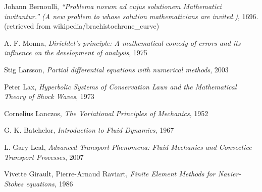 \documentclass[11pt,a4paper]{memoir}
\begin{document}
\begin{thebibliography}{9}
Johann Bernoulli, \textit{``Problema novum ad cujus solutionem Mathematici invitantur.'' (A new problem to whose solution mathematicians are invited.)}, 1696.
(retrieved from wikipedia/brachistochrone\_curve)

A. F. Monna, \textit{Dirichlet's principle: A mathematical comedy of errors and its influence on the development of analysis}, 1975

Stig Larsson, \textit{Partial differential equations with numerical methods}, 2003

Peter Lax, \textit{Hyperbolic Systems of Conservation Laws and the Mathematical Theory of Shock Waves}, 1973

Cornelius Lanczos, \textit{The Variational Principles of Mechanics}, 1952

G. K. Batchelor, \textit{Introduction to Fluid Dynamics}, 1967

L. Gary Leal, \textit{Advanced Transport Phenomena: Fluid Mechanics and Convectice Transport Processes}, 2007

Vivette Girault, Pierre-Arnaud Raviart, \textit{Finite Element Methods for Navier-Stokes equations}, 1986


\end{thebibliography}
\end{document}
